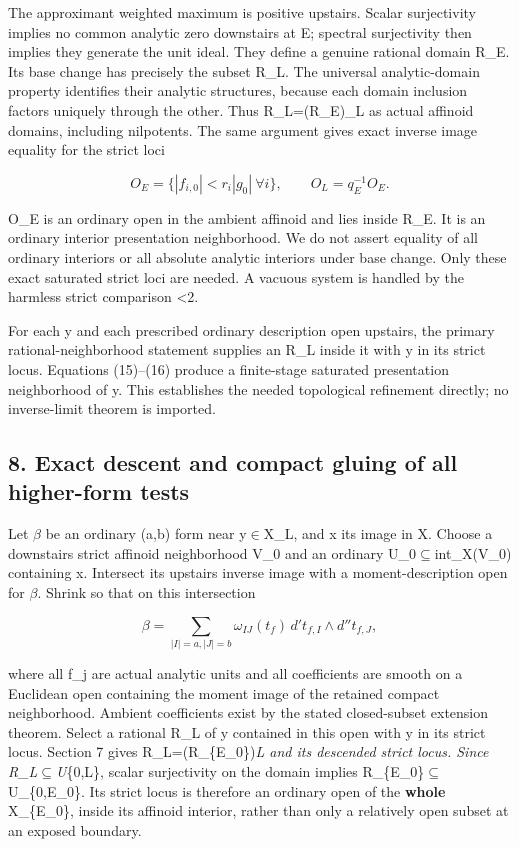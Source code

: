 \documentclass[
  10pt,
]{article}
\begin{document}
The approximant weighted maximum is positive upstairs. Scalar
surjectivity implies no common analytic zero downstairs at E; spectral
surjectivity then implies they generate the unit ideal. They define a
genuine rational domain R\_E. Its base change has precisely the subset
R\_L. The universal analytic-domain property identifies their analytic
structures, because each domain inclusion factors uniquely through the
other. Thus R\_L=(R\_E)\_L as actual affinoid domains, including
nilpotents. The same argument gives exact inverse image equality for the
strict loci

\[
 O_E=\{|f_{i,0}|<r_i|g_0|\ \forall i\},\qquad O_L=q_E^{-1}O_E. \tag{16}
\]

O\_E is an ordinary open in the ambient affinoid and lies inside R\_E.
It is an ordinary interior presentation neighborhood. We do not assert
equality of all ordinary interiors or all absolute analytic interiors
under base change. Only these exact saturated strict loci are needed. A
vacuous system is handled by the harmless strict comparison
\textbar\textless2\textbar.

For each y and each prescribed ordinary description open upstairs, the
primary rational-neighborhood statement supplies an R\_L inside it with
y in its strict locus. Equations (15)--(16) produce a finite-stage
saturated presentation neighborhood of y. This establishes the needed
topological refinement directly; no inverse-limit theorem is imported.

\subsection{8. Exact descent and compact gluing of all higher-form
tests}\label{exact-descent-and-compact-gluing-of-all-higher-form-tests}

Let \ensuremath{\beta} be an ordinary (a,b) form near y\ensuremath{\in}X\_L, and x its image in X.
Choose a downstairs strict affinoid neighborhood V\_0 and an ordinary
U\_0\ensuremath{\subseteq}int\_X(V\_0) containing x. Intersect its upstairs inverse image
with a moment-description open for \ensuremath{\beta}. Shrink so that on this
intersection

\[
 \beta=\sum_{|I|=a,|J|=b}
       \omega_{IJ}(t_f)\,d't_{f,I}\wedge d''t_{f,J},          \tag{17}
\]

where all f\_j are actual analytic units and all coefficients are smooth
on a Euclidean open containing the moment image of the retained compact
neighborhood. Ambient coefficients exist by the stated closed-subset
extension theorem. Select a rational R\_L of y contained in this open
with y in its strict locus. Section 7 gives R\_L=(R\_\{E\_0\})\emph{L
and its descended strict locus. Since R\_L\ensuremath{\subseteq}U}\{0,L\}, scalar
surjectivity on the domain implies R\_\{E\_0\}\ensuremath{\subseteq}U\_\{0,E\_0\}. Its strict
locus is therefore an ordinary open of the \textbf{whole} X\_\{E\_0\},
inside its affinoid interior, rather than only a relatively open subset
at an exposed boundary.
\end{document}
